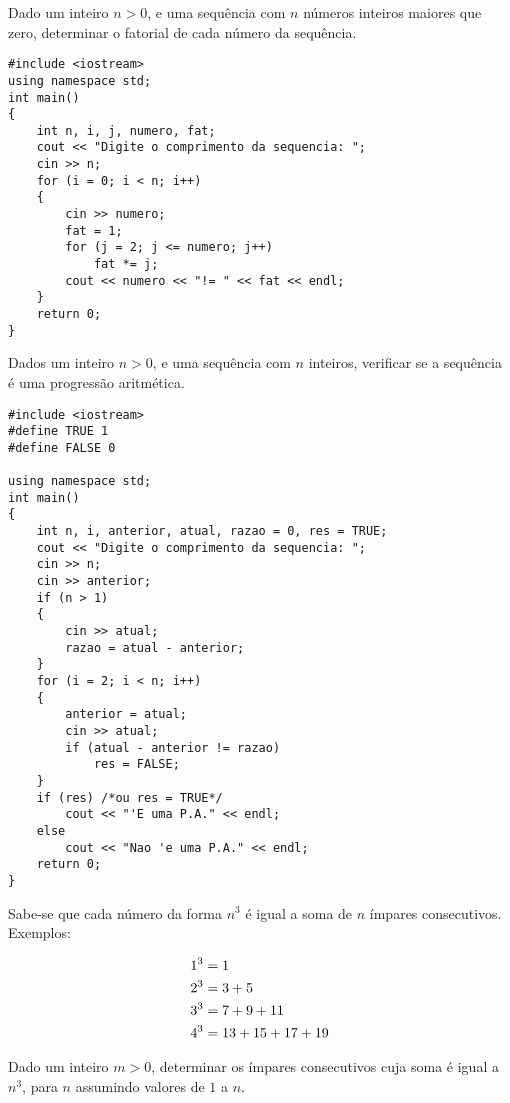 \documentclass[a4paper]{memoir}
\begin{document}
\begin{ex}[extra]\label{prob1extra02.cpp}
Dado um inteiro $n > 0$, e uma sequência com $n$ números inteiros maiores que zero, determinar o fatorial de cada número da sequência.
\end{ex}

\begin{sol}
\begin{lstlisting}
#include <iostream>
using namespace std;
int main()
{
    int n, i, j, numero, fat;
    cout << "Digite o comprimento da sequencia: ";
    cin >> n;
    for (i = 0; i < n; i++)
    {
        cin >> numero;
        fat = 1;
        for (j = 2; j <= numero; j++)
            fat *= j;
        cout << numero << "!= " << fat << endl;
    }
    return 0;
}
\end{lstlisting}
\end{sol}

\begin{prob}\label{prob114.cpp}
Dados um inteiro $n > 0$, e uma sequência com $n$ inteiros, verificar se a sequência é uma progressão aritmética.
\end{prob}

\begin{sol}
\begin{lstlisting}
#include <iostream>
#define TRUE 1
#define FALSE 0

using namespace std;
int main()
{
    int n, i, anterior, atual, razao = 0, res = TRUE;
    cout << "Digite o comprimento da sequencia: ";
    cin >> n;
    cin >> anterior;
    if (n > 1)
    {
        cin >> atual;
        razao = atual - anterior;
    }
    for (i = 2; i < n; i++)
    {
        anterior = atual;
        cin >> atual;
        if (atual - anterior != razao)
            res = FALSE;
    }
    if (res) /*ou res = TRUE*/
        cout << "'E uma P.A." << endl;
    else
        cout << "Nao 'e uma P.A." << endl;
    return 0;
}
\end{lstlisting}
\end{sol}

\begin{prob}\label{prob115.cpp}
Sabe-se que cada número da forma $n^3$ é igual a soma de $n$ ímpares consecutivos. Exemplos:

\[
\begin{gathered}
  1^3 = 1 \hfill \\
  2^3 = 3 + 5 \hfill \\
  3^3 = 7 + 9 + 11 \hfill \\
  4^3 = 13 + 15 + 17 + 19 \hfill \\
\end{gathered}
\]

Dado um inteiro $m > 0$, determinar os ímpares consecutivos cuja soma é igual a $n^3$, para $n$ assumindo valores de $1$ a $n$.
\end{prob}
\end{document}
